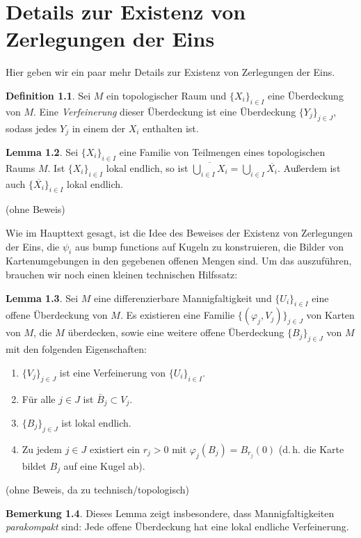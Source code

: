 \documentclass[a4paper]{scrreprt}
\numberwithin{equation}{chapter}
\theoremstyle{definition}
\newtheorem{defn}{Definition}[section]
\newtheorem{lemma}[defn]{Lemma}
\newtheorem{bem}[defn]{Bemerkung}
\begin{document}
\chapter{Details zur Existenz von Zerlegungen der Eins}
\label{appendix:details_zerl_eins}
Hier geben wir ein paar mehr Details zur Existenz von Zerlegungen der Eins.
\begin{defn}
	Sei $M$ ein topologischer Raum und $\{X_i\}_{i\in I}$ eine Überdeckung von $M$. Eine \emph{Verfeinerung} dieser Überdeckung ist eine Überdeckung $\{Y_j\}_{j\in J}$, sodass jedes $Y_j$ in einem der $X_i$ enthalten ist.
\end{defn}
\begin{lemma} \label{lemma:lok_endl_abschluss}
	Sei $\{X_i\}_{i\in I}$ eine Familie von Teilmengen eines topologischen Raums $M$. Ist $\{X_i\}_{i\in I}$ lokal endlich, so ist $\overline{\bigcup_{i\in I} X_i} = \bigcup_{i\in I} \overline{X_i}$. Außerdem ist auch $\{\overline{X_i}\}_{i\in I}$ lokal endlich.

	(ohne Beweis)
\end{lemma}
Wie im Haupttext gesagt, ist die Idee des Beweises der Existenz von Zerlegungen der Eins, die $\psi_i$ aus bump functions auf Kugeln zu konstruieren, die Bilder von Kartenumgebungen in den gegebenen offenen Mengen sind. Um das auszuführen, brauchen wir noch einen kleinen technischen Hilfssatz:
\begin{lemma}
	Sei $M$ eine differenzierbare Mannigfaltigkeit und $\{U_i\}_{i\in I}$ eine offene Überdeckung von $M$. Es existieren eine Familie $\{(\varphi_j,V_j)\}_{j\in J}$ von Karten von $M$, die $M$ überdecken, sowie eine weitere offene Überdeckung $\{B_j\}_{j\in J}$ von $M$ mit den folgenden Eigenschaften:
	\begin{enumerate}[label=(\roman*)]
		\item $\{V_j\}_{j\in J}$ ist eine Verfeinerung von $\{U_i\}_{i\in I}$.
		\item Für alle $j\in J$ ist $\bar B_j \subset V_j$.
		\item $\{B_j\}_{j\in J}$ ist lokal endlich.
		\item Zu jedem $j\in J$ existiert ein $r_j > 0$ mit $\varphi_j(B_j) = B_{r_j}(0)$ (d.\,h. die Karte bildet $B_j$ auf eine Kugel ab).
	\end{enumerate}

	(ohne Beweis, da zu technisch/topologisch)
\end{lemma}
\begin{bem}
	Dieses Lemma zeigt insbesondere, dass Mannigfaltigkeiten \emph{parakompakt} sind: Jede offene Überdeckung hat eine lokal endliche Verfeinerung.
\end{bem}
\end{document}
